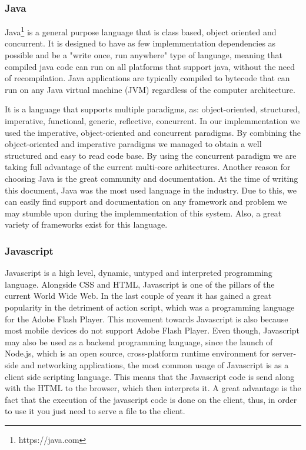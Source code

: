 \subsubsection{Java}
\label{sec:programming-languages-java}
Java\footnote{https://java.com} is a general purpose language that is class based, object oriented and concurrent. 
It is designed to have as few implemmentation dependencies as possible and be a "write once, run anywhere" type of language, meaning that compiled java code can run on all platforms that support java, without the need of recompilation.
Java applications are typically compiled to bytecode that can run on any Java virtual machine (JVM) regardless of the computer architecture.

It is a language that supports multiple paradigms, as:  object-oriented, structured, imperative, functional, generic, reflective, concurrent. In our implemmentation we used the imperative, object-oriented and concurrent paradigms. By combining the object-oriented and imperative paradigms we managed to obtain a well structured and easy to read code base. By using the concurrent paradigm we are taking full advantage of the current multi-core arhitectures.
Another reason for choosing Java is the great community and documentation. At the time of writing this document, Java was the most used language in the industry. Due to this, we can easily find support and documentation on any framework and problem we may stumble upon during the implemmentation of this system. Also, a great variety of frameworks exist for this language.

\subsubsection{Javascript}
\label{sec:programming-languages-javascript}
Javascript is a high level, dynamic, untyped and interpreted programming language. Alongside CSS and HTML, Javascript is one of the pillars of the current World Wide Web. In the last couple of years it has gained a great popularity in the detriment of action script, which was a programming language for the Adobe Flash Player. This movement towards Javascript is also because most mobile devices do not support Adobe Flash Player.
Even though, Javascript may also be used as a backend programming language, since the launch of Node.js, which is  an open source, cross-platform runtime environment for server-side and networking applications, the most common usage of Javascript is as a client side scripting language. This means that the Javascript code is send along with the HTML to the browser, which then interprets it. A great advantage is the fact that the execution of the javascript code is done on the client, thus, in order to use it you just need to serve a file to the client.

